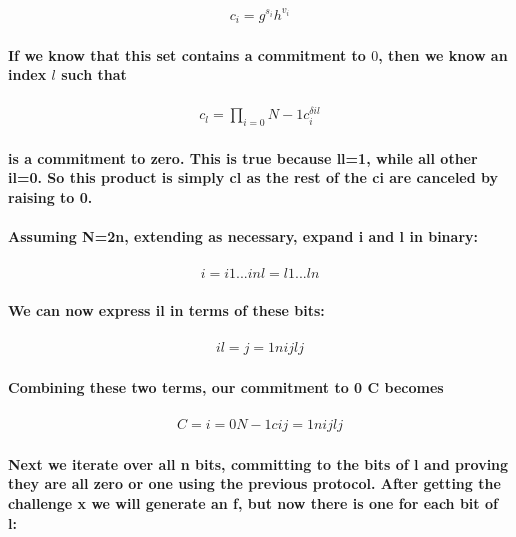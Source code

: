 \documentclass{article}
\begin{document}
\begin{eqnarray}
  c_i = g^{s_i} h^{v_i}
\end{eqnarray}

\paragraph{If we know that this set contains a commitment to $0$, then we know an index $l$ such that}

\begin{eqnarray}
  c_l = \prod_{i=0}{N-1} c_i^{\delta{il}}
\end{eqnarray}

\paragraph{is a commitment to zero.  This is true because ll=1, while all other il=0. So this product is simply cl as the rest of the ci are canceled by raising to 0.}

\paragraph{Assuming N=2n, extending as necessary, expand i and l in binary:}

\begin{eqnarray}
  i = i1...in
  l = l1...ln
\end{eqnarray}

\paragraph{We can now express il in terms of these bits:}

\begin{eqnarray}
  il=j=1nijlj
\end{eqnarray}
  
\paragraph{Combining these two terms, our commitment to 0 C becomes}

\begin{eqnarray}
  C=i=0N-1cij=1nijlj
\end{eqnarray}

\paragraph{Next we iterate over all n bits, committing to the bits of l and proving they are all zero or one using the previous protocol.  After getting the challenge x we will generate an f, but now there is one for each bit of l:}
\end{document}
